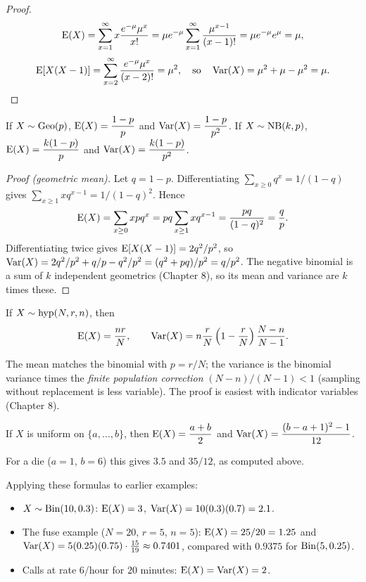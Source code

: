\begin{proof}
\[
  \operatorname{E}(X) = \sum_{x=1}^\infty x\frac{e^{-\mu}\mu^x}{x!} = \mu e^{-\mu}\sum_{x=1}^\infty
  \frac{\mu^{x-1}}{(x-1)!} = \mu e^{-\mu}e^{\mu} = \mu,
\]
\[
  \operatorname{E}[X(X-1)] = \sum_{x=2}^\infty \frac{e^{-\mu}\mu^x}{(x-2)!} = \mu^2,
  \quad\text{so}\quad \operatorname{Var}(X) = \mu^2 + \mu - \mu^2 = \mu.
\]
\end{proof}

\begin{theorem}
If $X\sim\operatorname{Geo}(p)$, $\operatorname{E}(X) = \dfrac{1-p}{p}$ and $\operatorname{Var}(X) = \dfrac{1-p}{p^2}$. If
$X\sim\operatorname{NB}(k,p)$, $\operatorname{E}(X) = \dfrac{k(1-p)}{p}$ and $\operatorname{Var}(X) = \dfrac{k(1-p)}{p^2}$.
\end{theorem}

\begin{proof}[Proof (geometric mean)]
Let $q = 1-p$. Differentiating $\sum_{x\ge0} q^x = 1/(1-q)$ gives
$\sum_{x\ge1} xq^{x-1} = 1/(1-q)^2$. Hence
\[
  \operatorname{E}(X) = \sum_{x\ge 0} x p q^x = pq\sum_{x\ge1}xq^{x-1} = \frac{pq}{(1-q)^2} = \frac{q}{p}.
\]
Differentiating twice gives $\operatorname{E}[X(X-1)] = 2q^2/p^2$, so
$\operatorname{Var}(X) = 2q^2/p^2 + q/p - q^2/p^2 = (q^2 + pq)/p^2 = q/p^2$. The negative binomial is a
sum of $k$ independent geometrics (Chapter 8), so its mean and variance are $k$ times
these.
\end{proof}

\begin{theorem}[Hypergeometric]
If $X\sim\operatorname{hyp}(N,r,n)$, then
\[
  \operatorname{E}(X) = \frac{nr}{N}, \qquad \operatorname{Var}(X) = n\frac{r}{N}\left(1-\frac rN\right)\frac{N-n}{N-1}.
\]
\end{theorem}

The mean matches the binomial with $p = r/N$; the variance is the binomial variance times
the \emph{finite population correction} $(N-n)/(N-1) < 1$ (sampling without replacement
is less variable). The proof is easiest with indicator variables (Chapter 8).

\begin{theorem}
If $X$ is uniform on $\{a,\dots,b\}$, then $\operatorname{E}(X) = \dfrac{a+b}{2}$ and
$\operatorname{Var}(X) = \dfrac{(b-a+1)^2 - 1}{12}$.
\end{theorem}

For a die ($a=1$, $b=6$) this gives $3.5$ and $35/12$, as computed above.

\begin{example}
Applying these formulas to earlier examples:
\begin{itemize}
  \item $X\sim\operatorname{Bin}(10, 0.3)$: $\operatorname{E}(X) = 3$, $\operatorname{Var}(X) = 10(0.3)(0.7) = 2.1$.
  \item The fuse example ($N=20$, $r=5$, $n=5$): $\operatorname{E}(X) = 25/20 = 1.25$ and
        $\operatorname{Var}(X) = 5(0.25)(0.75)\cdot\frac{15}{19} \approx 0.7401$, compared with
        $0.9375$ for $\operatorname{Bin}(5, 0.25)$.
  \item Calls at rate $6$/hour for $20$ minutes: $\operatorname{E}(X) = \operatorname{Var}(X) = 2$.
\end{itemize}
\end{example}

